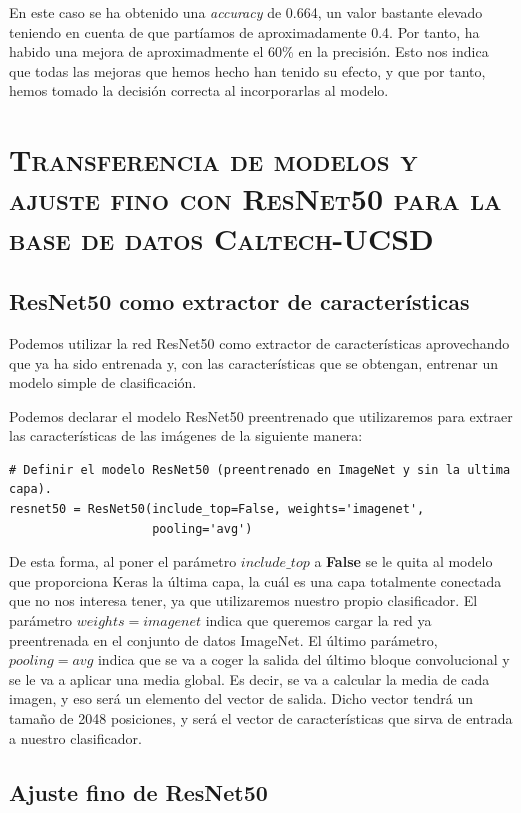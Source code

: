 \documentclass[11pt,a4paper]{article}
\begin{document}
En este caso se ha obtenido una \textit{accuracy} de 0.664, un valor bastante elevado teniendo en cuenta
de que partíamos de aproximadamente 0.4. Por tanto, ha habido una mejora de aproximadmente el 60\% en
la precisión. Esto nos indica que todas las mejoras que hemos hecho han tenido su efecto, y que por tanto,
hemos tomado la decisión correcta al incorporarlas al modelo.

\section{\textsc{Transferencia de modelos y ajuste fino con ResNet50 para la base de datos Caltech-UCSD}}

\subsection{ResNet50 como extractor de características}

Podemos utilizar la red ResNet50 como extractor de características aprovechando que ya ha sido
entrenada y, con las características que se obtengan, entrenar un modelo simple de clasificación.

Podemos declarar el modelo ResNet50 preentrenado que utilizaremos para extraer las características
de las imágenes de la siguiente manera:

\begin{lstlisting}
# Definir el modelo ResNet50 (preentrenado en ImageNet y sin la ultima capa).
resnet50 = ResNet50(include_top=False, weights='imagenet',
					pooling='avg')
\end{lstlisting}

De esta forma, al poner el parámetro $include\_top$ a \textbf{False} se le quita al modelo
que proporciona Keras la última capa, la cuál es una capa totalmente conectada que no nos
interesa tener, ya que utilizaremos nuestro propio clasificador. El parámetro $weights = imagenet$
indica que queremos cargar la red ya preentrenada en el conjunto de datos ImageNet.
El último parámetro, $pooling = avg$ indica que se va a coger la salida del último bloque
convolucional y se le va a aplicar una media global. Es decir, se va a calcular
la media de cada imagen, y eso será un elemento del vector de salida. Dicho vector
tendrá un tamaño de 2048 posiciones, y será el vector de características que sirva de
entrada a nuestro clasificador.

\subsection{Ajuste fino de ResNet50}

\newpage



\end{document}
